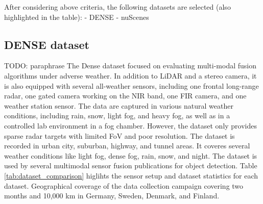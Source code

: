 \documentclass[report.tex]{subfiles}
\begin{document}
    After considering above criteria, the following datasets are selected (also highlighted in the table): 
    - DENSE
    - nuScenes

    \subsection{DENSE dataset \cite{bijelic2020seeing}}

    TODO: paraphrase
    The Dense dataset \cite{bijelic2020seeing} focused on evaluating multi-modal fusion algorithms under adverse weather. In addition to LiDAR and a stereo camera, it is also equipped with several all-weather sensors, including one frontal long-range radar, one gated camera working on the NIR band, one FIR camera, and one weather station sensor. The data are captured in various natural weather conditions, including rain, snow, light fog, and heavy fog, as well as in a controlled lab environment in a fog chamber. However, the dataset only provides sparse radar targets with limited FoV and poor resolution. The dataset is recorded in urban city, suburban, highway, and tunnel areas. It coveres several weather conditions like light fog, dense fog, rain, snow, and night. The dataset is used by several multimodal sensor fusion publications for object detection. Table \ref{tab:dataset_comparison} higlihts the sensor setup and dataset statistics for each dataset. Geographical coverage of the data collection campaign covering two months and 10,000 km in Germany,
    Sweden, Denmark, and Finland. 
\end{document}
